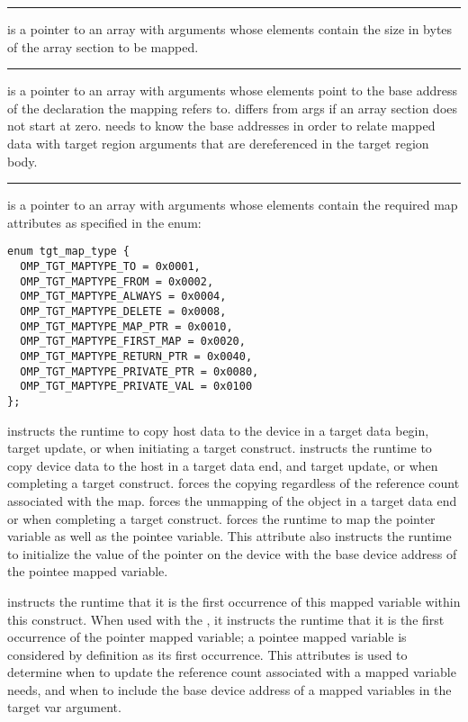 \noindent\rule{\textwidth}{0.4pt}

 is a pointer to an array with  arguments whose elements contain the size in bytes of the array section to be mapped.

\noindent\rule{\textwidth}{0.4pt}

 is a pointer to an array with  arguments whose elements point to the base address of the declaration the mapping refers to.  differs from args if an array section does not start at zero. \libomptarget{} needs to know the base addresses in order to relate mapped data with target region arguments that are dereferenced in the target region body.

\noindent\rule{\textwidth}{0.4pt}

 is a pointer to an array with  arguments whose elements contain the required map attributes as specified in the enum:
\begin{lstlisting}
enum tgt_map_type {
  OMP_TGT_MAPTYPE_TO = 0x0001,
  OMP_TGT_MAPTYPE_FROM = 0x0002,
  OMP_TGT_MAPTYPE_ALWAYS = 0x0004,
  OMP_TGT_MAPTYPE_DELETE = 0x0008,
  OMP_TGT_MAPTYPE_MAP_PTR = 0x0010,
  OMP_TGT_MAPTYPE_FIRST_MAP = 0x0020,
  OMP_TGT_MAPTYPE_RETURN_PTR = 0x0040,
  OMP_TGT_MAPTYPE_PRIVATE_PTR = 0x0080,
  OMP_TGT_MAPTYPE_PRIVATE_VAL = 0x0100
};
\end{lstlisting}

\sloppy
{} instructs the runtime to copy  host data to the device in a target data begin, target update, or when initiating a target construct.   instructs the runtime to copy  device data to the host in a target data end, and target update, or when completing a target construct.   forces the copying regardless of the reference count associated with the map.    forces the unmapping of the object in a target data end or when completing a target construct.  forces the runtime to map the pointer variable as well as the pointee variable. This attribute also instructs the runtime to initialize the value of the pointer on the device with the base device address of the pointee mapped variable. 

 instructs the runtime that it is the first occurrence of this mapped variable within this construct.  When used with  the , it instructs the runtime that it is the first occurrence of the pointer mapped variable; a pointee mapped variable is considered by definition as its first occurrence. This attributes is used to determine when to update the reference count associated with a mapped variable needs, and when to include the base device address of a mapped variables in the target var argument. 

